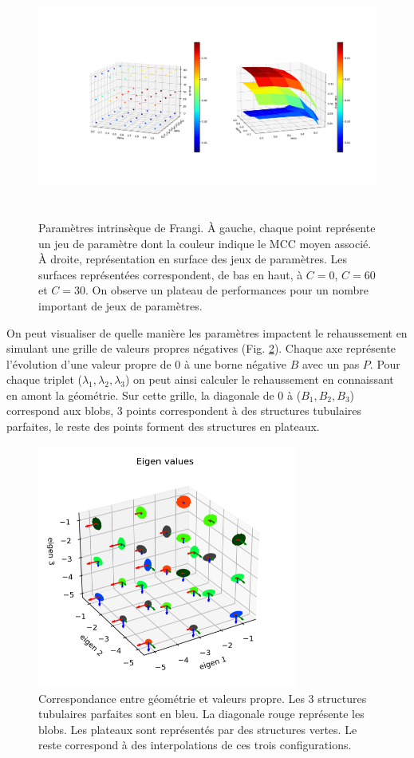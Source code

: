 \begin{figure}[H]
  \centering
  \includegraphics[height=8cm]{Images/frangi_params.png}
  \caption{Paramètres intrinsèque de Frangi. À gauche, chaque point représente un jeu de paramètre dont la couleur indique le MCC moyen associé. À droite, représentation en surface des jeux de paramètres. Les surfaces représentées correspondent, de bas en haut, à $C=0$, $C=60$ et $C=30$. On observe un plateau de performances pour un nombre important de jeux de paramètres.}
  \label{fig:frangi_params}
  
\end{figure}
On peut visualiser de quelle manière les paramètres impactent le rehaussement en simulant une grille de valeurs propres négatives (Fig. \ref{fig:exemple_geometry}). Chaque axe représente l'évolution d'une valeur propre de 0 à une borne négative $B$ avec un pas $P$. Pour chaque triplet ($\lambda_1,\lambda_2,\lambda_3$) on peut ainsi calculer le rehaussement en connaissant en amont la géométrie. Sur cette grille, la diagonale de 0 à ($B_1,B_2,B_3$) correspond aux blobs, 3 points correspondent à des structures tubulaires parfaites, le reste des points forment des structures en plateaux.

\begin{figure}[H]
  \centering
  \includegraphics[height=8cm]{Images/eigen_meaning.png}
  \caption{Correspondance entre géométrie et valeurs propre. Les 3 structures tubulaires parfaites sont en bleu. La diagonale rouge représente les blobs. Les plateaux sont représentés par des structures vertes. Le reste correspond à des interpolations de ces trois configurations.}
  \label{fig:exemple_geometry}
\end{figure}



